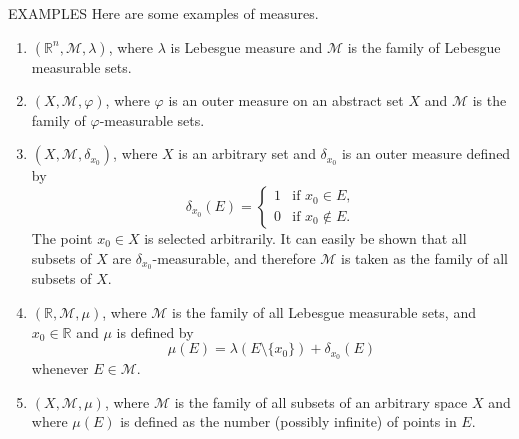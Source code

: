 \documentclass[../main.tex]{subfiles}
\begin{document}
\begin{example}{EXAMPLES}{}
Here are some examples of measures.
\begin{enumerate}
    \item $(\mathbb{R}^n, \mathcal{M}, \lambda)$, where $\lambda$ is Lebesgue measure and $\mathcal{M}$ is the family of Lebesgue measurable sets.
    \item $(X, \mathcal{M}, \varphi)$, where $\varphi$ is an outer measure on an abstract set $X$ and $\mathcal{M}$ is the family of $\varphi$-measurable sets.
    \item $(X, \mathcal{M}, \delta_{x_0})$, where $X$ is an arbitrary set and $\delta_{x_0}$ is an outer measure defined by
    \[
        \delta_{x_0}(E) = \begin{cases} 1 & \text{if } x_0 \in E, \\ 0 & \text{if } x_0 \notin E. \end{cases}
    \]
    The point $x_0 \in X$ is selected arbitrarily. It can easily be shown that all subsets of $X$ are $\delta_{x_0}$-measurable, and therefore $\mathcal{M}$ is taken as the family of all subsets of $X$.
    \item $(\mathbb{R}, \mathcal{M}, \mu)$, where $\mathcal{M}$ is the family of all Lebesgue measurable sets, and $x_0 \in \mathbb{R}$ and $\mu$ is defined by
    \[
        \mu(E) = \lambda(E \setminus \{x_0\}) + \delta_{x_0}(E)
    \]
    whenever $E \in \mathcal{M}$.
    \item $(X, \mathcal{M}, \mu)$, where $\mathcal{M}$ is the family of all subsets of an arbitrary space $X$ and where $\mu(E)$ is defined as the number (possibly infinite) of points in $E$.
\end{enumerate}
\end{example}
\end{document}
